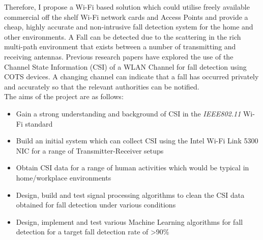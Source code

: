Therefore, I propose a Wi-Fi based solution which could utilise freely available commercial off the shelf Wi-Fi network cards and Access Points and provide a cheap, highly accurate and non-intrusive fall detection system for the home and other environments. A Fall can be detected due to the scattering in the rich multi-path environment that exists between a number of transmitting and receiving antennas. Previous research papers have explored the use of the Channel State Information (CSI) of a WLAN Channel for fall detection using COTS devices. A changing channel can indicate that a fall has occurred privately and accurately so that the relevant authorities can be notified. \\
The aims of the project are as follows: 
\begin{itemize}[noitemsep, topsep=0pt]
\item Gain a strong understanding and background of CSI in the \textit{IEEE802.11} Wi-Fi standard 
\item Build an initial system which can collect CSI using the Intel Wi-Fi Link 5300 NIC for a range of Transmitter-Receiver setups
\item Obtain CSI data for a range of human activities which would be typical in home/workplace environments
\item Design, build and test signal processing algorithms to clean the CSI data obtained for fall detection under various conditions
\item Design, implement and test various Machine Learning algorithms for fall detection for a target fall detection rate of >90\%
\end{itemize}
